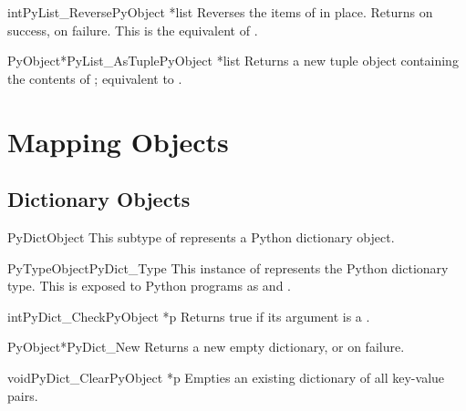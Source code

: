 \documentclass{manual}
\begin{document}
\begin{cfuncdesc}{int}{PyList_Reverse}{PyObject *list}
Reverses the items of  in place.  Returns  on
success,  on failure.  This is the equivalent of
.
\end{cfuncdesc}

\begin{cfuncdesc}{PyObject*}{PyList_AsTuple}{PyObject *list}
Returns a new tuple object containing the contents of ;
equivalent to .
\end{cfuncdesc}


\section{Mapping Objects \label{mapObjects}}



\subsection{Dictionary Objects \label{dictObjects}}

\begin{ctypedesc}{PyDictObject}
This subtype of  represents a Python dictionary object.
\end{ctypedesc}

\begin{cvardesc}{PyTypeObject}{PyDict_Type}
This instance of  represents the Python dictionary 
type.  This is exposed to Python programs as  and 
.
\end{cvardesc}

\begin{cfuncdesc}{int}{PyDict_Check}{PyObject *p}
Returns true if its argument is a .
\end{cfuncdesc}

\begin{cfuncdesc}{PyObject*}{PyDict_New}{}
Returns a new empty dictionary, or \NULL{} on failure.
\end{cfuncdesc}

\begin{cfuncdesc}{void}{PyDict_Clear}{PyObject *p}
Empties an existing dictionary of all key-value pairs.
\end{cfuncdesc}
\end{document}
